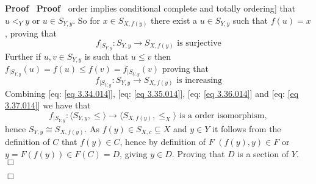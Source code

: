 \documentclass{book}
\newenvironment{proof}{\noindent\textbf{Proof\ }}{\hspace*{\fill}$\Box$\medskip}
\begin{document}
\begin{proof}
\begin{proof}
{    order implies conditional complete and totally ordering}] that $u <_Y y$
    or $u \in S_{Y, y}$. So for $x \in S_{X, f (y)}$ there exist a $u \in
    S_{Y, y}$ such that $f (u) = x$, proving that
    \begin{equation}
      \label{eq 3.36.014} f_{|S_{Y, y}} : S_{Y, y} \rightarrow S_{X, f (y)}
      \text{ is surjective}
    \end{equation}
    Further if $u, v \in S_{Y, y}$ is such that $u \leqslant v$ then
    $f_{|S_{Y, y}} (u) = f (u) \leqslant f (v) = f_{|S_{U, y}} (v)$ proving
    that
    \begin{equation}
      \label{eq 3.37.014} f_{|S_{Y, y}} : S_{Y, y} \rightarrow S_{X, f (y)}
      \text{ is increasing}
    \end{equation}
    Combining [eq: \ref{eq 3.34.014}], [eq: \ref{eq 3.35.014}], [eq: \ref{eq
    3.36.014}] and [eq: \ref{eq 3.37.014}] we have that
    \[ f_{|S_{Y, y}} : \langle S_{Y, y}, \leqslant  \rangle \rightarrow
       \langle S_{X, f (y)}, \leqslant_X \rangle \text{ is a order
       isomorphism}, \]
    hence $S_{Y, y} \cong S_{X, f (y)}$. As $f (y) \in S_{X, c} \subseteq X$
    and $y \in Y$ it follows from the definition of $C$ that $f (y) \in C$,
    hence by definition of $F$ $(f (y), y) \in F$ or $y = F (f (y)) \in F (C)
    = D$, giving $y \in D$. Proving that $D$ is a section of $Y$.
  \end{proof}
  

\end{proof}
\end{document}
